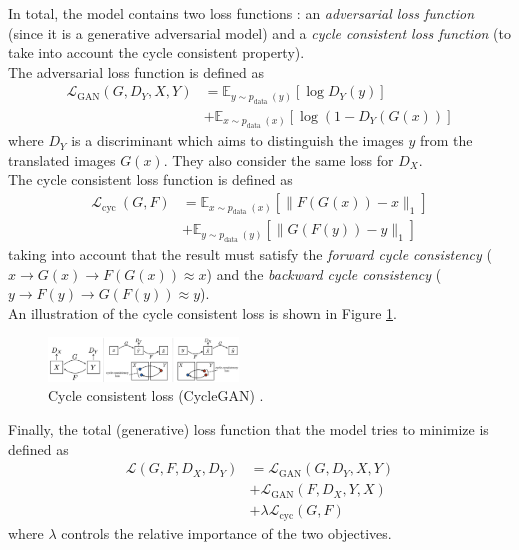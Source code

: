 \documentclass[twocolumn,superscriptaddress,aps,floatfix, nofootinbib]{revtex4-1}
\begin{document}
    In total, the model contains two loss functions : an \emph{adversarial loss function} (since it is a generative adversarial model) and a \emph{cycle consistent loss function} (to take into account the cycle consistent property).\\
    
    The adversarial loss function is defined as
    \begin{align}
        \mathcal{L}_{\mathrm{GAN}}\left(G, D_{Y}, X, Y\right)&=\mathbb{E}_{y \sim p_{\text {data }}(y)}\left[\log D_{Y}(y)\right]\nonumber\\
        &+\mathbb{E}_{x \sim p_{\text {data }}(x)}\left[\log \left(1-D_{Y}(G(x))\right]\right.
    \end{align}
    where $D_Y$ is a discriminant which aims to distinguish the images ${y}$ from the translated images ${G(x)}$. They also consider the same loss for $D_X$.\\
    
    The cycle consistent loss function is defined as
    \begin{align}
        \mathcal{L}_{\text {cyc }}(G, F) &=\mathbb{E}_{x \sim p_{\text {data }}(x)}\left[\|F(G(x))-x\|_{1}\right]\nonumber\\
        &+\mathbb{E}_{y \sim p_{\text {data }}(y)}\left[\|G(F(y))-y\|_{1}\right]
    \end{align}
    taking into account that the result must satisfy the \emph{forward cycle consistency} ($x\rightarrow G(x)\rightarrow F(G(x))\approx x$) and the \emph{backward cycle consistency} ($y\rightarrow F(y)\rightarrow G(F(y))\approx y$).\\
    
    An illustration of the cycle consistent loss is shown in Figure \ref{fig:methods.cyclegan.cycleconsistentloss}.\\
    
    \begin{figure}[ht]
        \centering
        \includegraphics[width=0.45\textwidth]{resources/png/cycle-consistent-loss.png}
        \caption{Cycle consistent loss (CycleGAN) \cite{DBLP:journals/corr/ZhuPIE17}.}
        \label{fig:methods.cyclegan.cycleconsistentloss}
    \end{figure}
    
    Finally, the total (generative) loss function that the model tries to minimize is defined as
    \begin{align}
        \mathcal{L}\left(G, F, D_{X}, D_{Y}\right) &= \mathcal{L}_{\mathrm{GAN}}\left(G, D_{Y}, X, Y\right)\nonumber\\
        &+ \mathcal{L}_{\mathrm{GAN}}\left(F, D_{X}, Y, X\right)\nonumber\\
        &+ \lambda \mathcal{L}_{\mathrm{cyc}}(G, F)
    \end{align}
    where $\lambda$ controls the relative importance of the two objectives.
    
\end{document}
